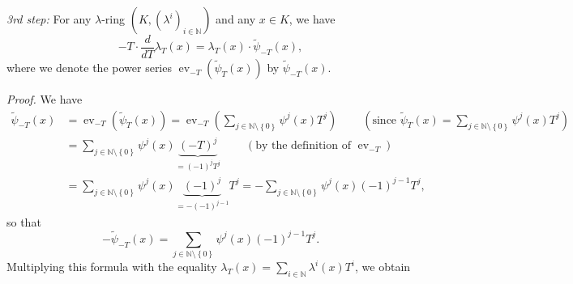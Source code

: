 \documentclass[numbers=enddot,12pt,final,onecolumn,notitlepage]{scrartcl}%
\begin{document}
\textit{3rd step:} For any $\lambda$-ring $\left(  K,\left(  \lambda
^{i}\right)  _{i\in\mathbb{N}}\right)  $ and any $x\in K$, we have%
\[
-T\cdot\dfrac{d}{dT}\lambda_{T}\left(  x\right)  =\lambda_{T}\left(  x\right)
\cdot\widetilde{\psi}_{-T}\left(  x\right)  ,
\]
where we denote the power series $\operatorname*{ev}\nolimits_{-T}\left(
\widetilde{\psi}_{T}\left(  x\right)  \right)  $ by $\widetilde{\psi}%
_{-T}\left(  x\right)  $.

\textit{Proof.} We have
\begin{align*}
\widetilde{\psi}_{-T}\left(  x\right)   &  =\operatorname*{ev}\nolimits_{-T}%
\left(  \widetilde{\psi}_{T}\left(  x\right)  \right)  =\operatorname*{ev}%
\nolimits_{-T}\left(  \sum\limits_{j\in\mathbb{N}\setminus\left\{  0\right\}
}\psi^{j}\left(  x\right)  T^{j}\right)  \ \ \ \ \ \ \ \ \ \ \left(
\text{since }\widetilde{\psi}_{T}\left(  x\right)  =\sum\limits_{j\in
\mathbb{N}\setminus\left\{  0\right\}  }\psi^{j}\left(  x\right)  T^{j}\right)
\\
&  =\sum\limits_{j\in\mathbb{N}\setminus\left\{  0\right\}  }\psi^{j}\left(
x\right)  \underbrace{\left(  -T\right)  ^{j}}_{=\left(  -1\right)  ^{j}T^{j}%
}\ \ \ \ \ \ \ \ \ \ \left(  \text{by the definition of }\operatorname*{ev}%
\nolimits_{-T}\right) \\
&  =\sum\limits_{j\in\mathbb{N}\setminus\left\{  0\right\}  }\psi^{j}\left(
x\right)  \underbrace{\left(  -1\right)  ^{j}}_{=-\left(  -1\right)  ^{j-1}%
}T^{j}=-\sum\limits_{j\in\mathbb{N}\setminus\left\{  0\right\}  }\psi
^{j}\left(  x\right)  \left(  -1\right)  ^{j-1}T^{j},
\end{align*}
so that%
\[
-\widetilde{\psi}_{-T}\left(  x\right)  =\sum\limits_{j\in\mathbb{N}%
\setminus\left\{  0\right\}  }\psi^{j}\left(  x\right)  \left(  -1\right)
^{j-1}T^{j}.
\]
Multiplying this formula with the equality $\lambda_{T}\left(  x\right)
=\sum\limits_{i\in\mathbb{N}}\lambda^{i}\left(  x\right)  T^{i}$, we obtain%
\end{document}

